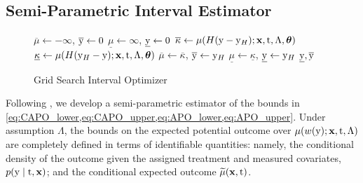 \subsection{Semi-Parametric Interval Estimator}
\label{sec:estimator}
\begin{figure}
    \begin{minipage}{0.46\textwidth}
        \vspace{-2em}
        \begin{algorithm}[H]
            \caption{Grid Search Interval Optimizer}
            \label{alg:grid-search}
            \begin{algorithmic}[1]
                    \State $\overline{\mu} \gets -\infty$, $\overline{\mathrm{y}} \gets 0$ 
                    \State $\underline{\mu} \gets \infty$, $\underline{\mathrm{y}} \gets 0$
                    \For{$\yH \in \widehat{\Ycal}$}
                        \State $\overline{\kappa} \gets \mu(H(\mathrm{y} - \mathrm{y}_{H}); \mathbf{x}, \mathrm{t}, \Lambda, \bm{\theta})$
                        \State $\underline{\kappa} \gets \mu(H(\mathrm{y}_{H} - \mathrm{y}); \mathbf{x}, \mathrm{t}, \Lambda, \bm{\theta})$
                        \If{$\overline{\kappa} > \overline{\mu}$}
                            \State $\overline{\mu}\gets \overline{\kappa}$, $\overline{\mathrm{y}} \gets \mathrm{y}_{H}$
                        \EndIf
                        \If{$\underline{\kappa} < \underline{\mu}$}
                            \State $\underline{\mu} \gets \underline{\kappa}$, $\underline{\mathrm{y}} \gets \mathrm{y}_{H}$
                        \EndIf
                    \EndFor
                    \State \Return $\underline{\mathrm{y}}, \overline{\mathrm{y}}$
                \EndFunction
            \end{algorithmic}
        \end{algorithm}
    \end{minipage}
\end{figure}
Following \cite{jesson2021quantifying}, we develop a semi-parametric estimator of the bounds in \cref{eq:CAPO_lower,eq:CAPO_upper,eq:APO_lower,eq:APO_upper}. 
Under assumption $\Lambda$, the bounds on the expected potential outcome over $\mu(w(\mathrm{y}); \mathbf{x}, \mathrm{t}, \Lambda)$ are completely defined in terms of identifiable quantities: namely, the conditional density of the outcome given the assigned treatment and measured covariates, $p(\mathrm{y} \mid \mathrm{t}, \mathbf{x})$; and the conditional expected outcome $\widetilde{\mu}(\mathbf{x}, \mathrm{t})$. 
